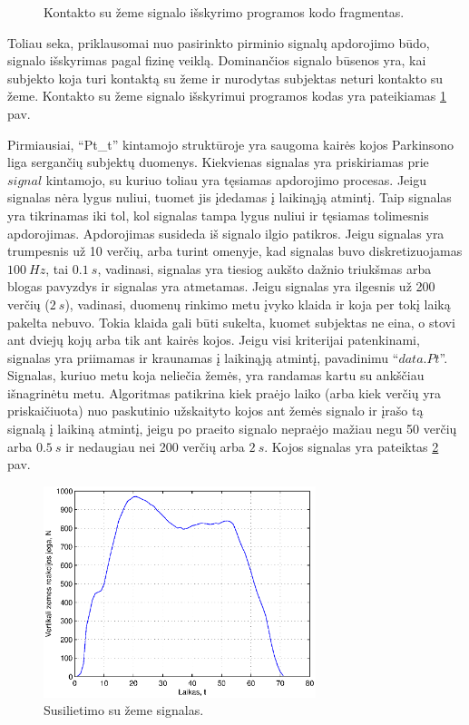\documentclass[]{vgtuef}
\begin{document}
\begin{figure}[t]
  \centering
  
  \caption{Kontakto su žeme signalo išskyrimo programos kodo fragmentas.}
  \label{code:signal_extraction}
\end{figure}

Toliau seka, priklausomai nuo pasirinkto pirminio signalų apdorojimo būdo, signalo išskyrimas pagal fizinę veiklą. Dominančios signalo būsenos yra, kai subjekto koja turi kontaktą su žeme ir nurodytas subjektas neturi kontakto su žeme. Kontakto su žeme signalo išskyrimui programos kodas yra pateikiamas \ref{code:signal_extraction} pav.

Pirmiausiai, ``Pt\_t'' kintamojo struktūroje yra saugoma kairės kojos Parkinsono liga sergančių subjektų duomenys. Kiekvienas signalas yra priskiriamas prie $signal$ kintamojo, su kuriuo toliau yra tęsiamas apdorojimo procesas. Jeigu signalas nėra lygus nuliui, tuomet jis įdedamas į laikinąją atmintį. Taip signalas yra tikrinamas iki tol, kol signalas tampa lygus nuliui ir tęsiamas tolimesnis apdorojimas. Apdorojimas susideda iš signalo ilgio patikros. Jeigu signalas yra trumpesnis už 10 verčių, arba turint omenyje, kad signalas buvo diskretizuojamas $100~Hz$, tai $0.1~s$, vadinasi, signalas yra tiesiog aukšto dažnio triukšmas arba blogas pavyzdys ir signalas yra atmetamas. Jeigu signalas yra ilgesnis už 200 verčių ($2~s$), vadinasi, duomenų rinkimo metu įvyko klaida ir koja per tokį laiką pakelta nebuvo. Tokia klaida gali būti sukelta, kuomet subjektas ne eina, o stovi ant dviejų kojų arba tik ant kairės kojos. Jeigu visi kriterijai patenkinami, signalas yra priimamas ir kraunamas į laikinąją atmintį, pavadinimu ``$data.Pt$''. Signalas, kuriuo metu koja neliečia žemės, yra randamas kartu su ankščiau išnagrinėtu metu. Algoritmas patikrina kiek praėjo laiko (arba kiek verčių yra priskaičiuota) nuo paskutinio užskaityto kojos ant žemės signalo ir įrašo tą signalą į laikiną atmintį, jeigu po praeito signalo nepraėjo mažiau negu 50 verčių arba $0.5~s$ ir nedaugiau nei 200 verčių arba $2~s$. Kojos signalas yra pateiktas \ref{fig:stance_phase} pav.

\begin{figure}[!t]
  \centering
  \includegraphics[width=300px]{figures/09_sample_stance_phase.eps}
  \caption{Susilietimo su žeme signalas.}
  \label{fig:stance_phase}
\end{figure}
\end{document}
